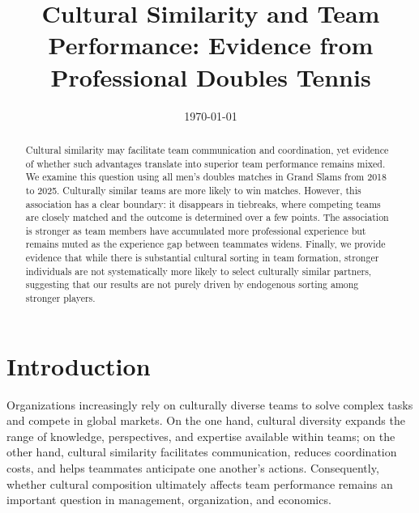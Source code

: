 \documentclass[10pt]{article}
\title{Cultural Similarity and Team Performance: Evidence from Professional Doubles Tennis}
\author{}
\date{\today}
\begin{document}
\maketitle
\thispagestyle{empty}

\begin{abstract}

Cultural similarity may facilitate team communication and coordination, yet evidence of whether such advantages translate into superior team performance remains mixed. We examine this question using all men’s doubles matches in Grand Slams from 2018 to 2025.  Culturally similar teams are more likely to win matches. However, this association has a clear boundary: it disappears in tiebreaks, where competing teams are closely matched and the outcome is determined over a few points. The association is stronger as team members have accumulated more professional experience but remains muted as the experience gap between teammates widens. Finally, we provide evidence that while there is substantial cultural sorting in team formation, stronger individuals are not systematically more likely to select culturally similar partners, suggesting that our results are not purely driven by endogenous sorting among stronger players.

\end{abstract}
\section{Introduction}
Organizations increasingly rely on culturally diverse teams to solve complex tasks and compete in global markets. On the one hand, cultural diversity expands the range of knowledge, perspectives, and expertise available within teams; on the other hand, cultural similarity facilitates communication, reduces coordination costs, and helps teammates anticipate one another’s actions. Consequently, whether cultural composition ultimately affects team performance remains an important question in management, organization, and economics. %
\end{document}
